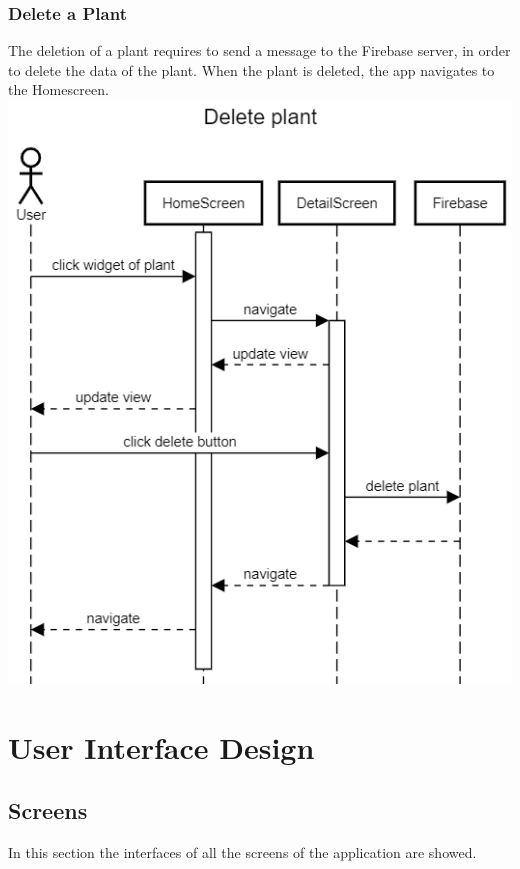 \documentclass[10pt]{article}
\begin{document}
	\subsubsection{Delete a Plant}
	The deletion of a plant requires to send a message to the Firebase server, in order to delete the data of the plant. When the plant is deleted, the app navigates to the Homescreen.
	\newline
	\newline
	\newline
	\includegraphics[scale=0.40]{resources/DeletePlant.png}
	
	\newpage
	
	\section{User Interface Design}
	\subsection{Screens}
	In this section the interfaces of all the screens of the application are showed.
	\newline
    
\end{document}
